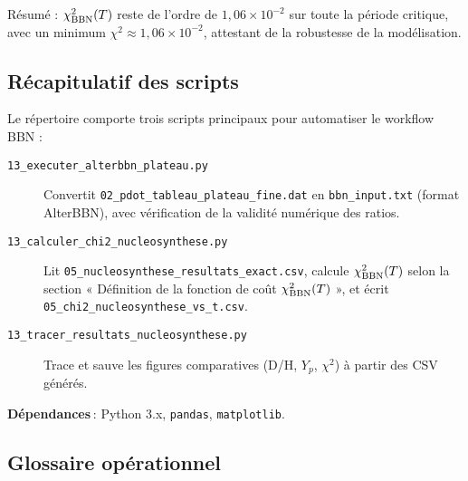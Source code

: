 {\small Résumé : \(\chi^2_{\rm BBN}(T)\) reste de l’ordre de \(1{,}06\times10^{-2}\) sur toute la période critique, avec un minimum \(\chi^2\approx1{,}06\times10^{-2}\), attestant de la robustesse de la modélisation.}

\subsection{Récapitulatif des scripts}

Le répertoire comporte trois scripts principaux pour automatiser le workflow BBN :

\begin{description}
  \item[\texttt{13\_executer\_alterbbn\_plateau.py}]  
    Convertit \texttt{02\_pdot\_tableau\_plateau\_fine.dat} en \texttt{bbn\_input.txt} (format AlterBBN), avec vérification de la validité numérique des ratios.

  \item[\texttt{13\_calculer\_chi2\_nucleosynthese.py}]  
    Lit \texttt{05\_nucleosynthese\_resultats\_exact.csv}, calcule \(\chi^{2}_{\rm BBN}(T)\) selon la section « Définition de la fonction de coût \(\chi^{2}_{\rm BBN}(T)\) », et écrit \texttt{05\_chi2\_nucleosynthese\_vs\_t.csv}.

  \item[\texttt{13\_tracer\_resultats\_nucleosynthese.py}]  
    Trace et sauve les figures comparatives (D/H, \(Y_{p}\), \(\chi^{2}\)) à partir des CSV générés.
\end{description}

\noindent\textbf{Dépendances} : Python 3.x, \texttt{pandas}, \texttt{matplotlib}.

\subsection*{Glossaire opérationnel}

